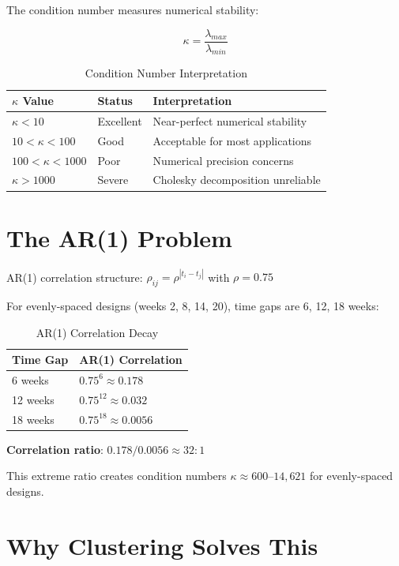 \documentclass[11pt]{article}
\theoremstyle{definition}
\begin{document}
The condition number measures numerical stability:

\begin{equation}
\kappa = \frac{\lambda_{max}}{\lambda_{min}}
\end{equation}

\begin{table}[h]
\centering
\caption{Condition Number Interpretation}
\begin{tabular}{@{}lll@{}}
\toprule
\textbf{$\kappa$ Value} & \textbf{Status} & \textbf{Interpretation} \\
\midrule
$\kappa < 10$ & Excellent & Near-perfect numerical stability \\
$10 < \kappa < 100$ & Good & Acceptable for most applications \\
$100 < \kappa < 1000$ & Poor & Numerical precision concerns \\
$\kappa > 1000$ & Severe & Cholesky decomposition unreliable \\
\bottomrule
\end{tabular}
\end{table}

\section{The AR(1) Problem}

AR(1) correlation structure: $\rho_{ij} = \rho^{|t_i - t_j|}$ with $\rho = 0.75$

For evenly-spaced designs (weeks 2, 8, 14, 20), time gaps are 6, 12, 18 weeks:

\begin{table}[h]
\centering
\caption{AR(1) Correlation Decay}
\begin{tabular}{@{}ll@{}}
\toprule
\textbf{Time Gap} & \textbf{AR(1) Correlation} \\
\midrule
6 weeks & $0.75^6 \approx 0.178$ \\
12 weeks & $0.75^{12} \approx 0.032$ \\
18 weeks & $0.75^{18} \approx 0.0056$ \\
\bottomrule
\end{tabular}
\end{table}

\textbf{Correlation ratio}: $0.178 / 0.0056 \approx 32:1$

This extreme ratio creates condition numbers $\kappa \approx 600$--$14,621$ for
evenly-spaced designs.

\section{Why Clustering Solves This}
\end{document}
